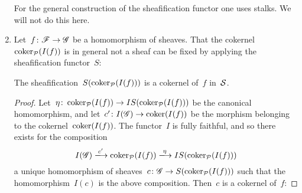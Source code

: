\begin{example}
\begin{enumerate}
      For the general construction of the sheafification functor one uses stalks.
      We will not do this here.
      
    \item
      Let~$f \colon \mathscr{F} \to \mathscr{G}$ be a homomorphism of sheaves.
      That the cokernel~$\operatorname{coker}_{\mathcal{P}}(I(f))$ is in general not a sheaf can be fixed by applying the sheafification functor~$S$:
      
      \begin{claimnonum}
        The sheafification~$S(\operatorname{coker}_{\mathcal{P}}(I(f)))$ is a cokernel of~$f$ in~$\mathcal{S}$.
      \end{claimnonum}
      
      \begin{proof}
        Let~$\eta \colon \operatorname{coker}_{\mathcal{P}}(I(f)) \to IS( \operatorname{coker}_{\mathcal{P}}(I(f)) )$ be the canonical homomorphism, and let~$c' \colon I(\mathscr{G}) \to \operatorname{coker}(I(f))$ be the morphism belonging to the cokernel~$\operatorname{coker}(I(f))$.
        The functor~$I$ is fully faithful, and so there exists for the composition
        \[
                          I(\sheaf{G})
          \xlongto{c'}    \coker_{\Pcat}(I(f))
          \xlongto{\eta}  IS(\coker_{\Pcat}(I(f)))
        \]
        a unique homomorphism of sheaves~$c \colon \mathscr{G} \to S(\operatorname{coker}_{\mathcal{P}}(I(f)))$ such that the homomorphism~$I(c)$ is the above composition.
        Then~$c$ is a cokernel of~$f$:
        

\end{proof}
\end{enumerate}
\end{example}
